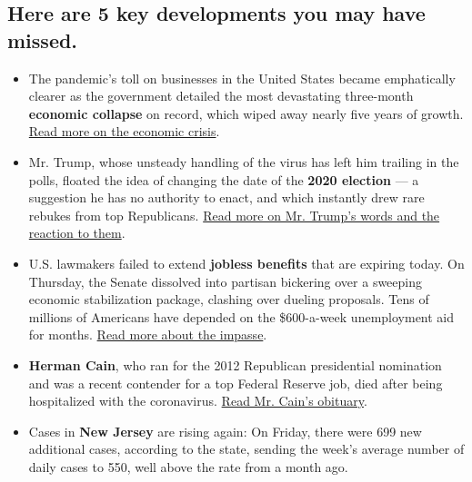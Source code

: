 \subsection{}

\hypertarget{here-are-5-key-developments-you-may-have-missed}{%
\subsection{Here are 5 key developments you may have
missed.}\label{here-are-5-key-developments-you-may-have-missed}}

\begin{itemize}
\item
  The pandemic's toll on businesses in the United States became
  emphatically clearer as the government detailed the most devastating
  three-month \textbf{economic collapse} on record, which wiped away
  nearly five years of growth.
  \href{https://www.nytimes3xbfgragh.onion/2020/07/30/business/economy/q2-gdp-coronavirus-economy.html}{Read
  more on the economic crisis}.
\item
  Mr. Trump, whose unsteady handling of the virus has left him trailing
  in the polls, floated the idea of changing the date of the
  \textbf{2020 election} --- a suggestion he has no authority to enact,
  and which instantly drew rare rebukes from top Republicans.
  \href{https://www.nytimes3xbfgragh.onion/2020/07/30/us/politics/trump-delay-2020-election.html?action=click\&module=Top\%20Stories\&pgtype=Homepage}{Read
  more on Mr. Trump's words and the reaction to them}.
\item
  U.S. lawmakers failed to extend \textbf{jobless benefits} that are
  expiring today. On Thursday, the Senate dissolved into partisan
  bickering over a sweeping economic stabilization package, clashing
  over dueling proposals. Tens of millions of Americans have depended on
  the \$600-a-week unemployment aid for months.
  \href{https://www.nytimes3xbfgragh.onion/2020/07/30/us/politics/senate-virus-aid.html}{Read
  more about the impasse}.
\item
  \textbf{Herman Cain}, who ran for the 2012 Republican presidential
  nomination and was a recent contender for a top Federal Reserve job,
  died after being hospitalized with the coronavirus.
  \href{https://www.nytimes3xbfgragh.onion/2020/07/30/us/politics/herman-cain-dead.html}{Read
  Mr. Cain's obituary}.
\item
  Cases in \textbf{New Jersey} are rising again: On Friday, there were
  699 new additional cases, according to the state, sending the week's
  average number of daily cases to 550, well above the rate from a month
  ago.


\end{itemize}
